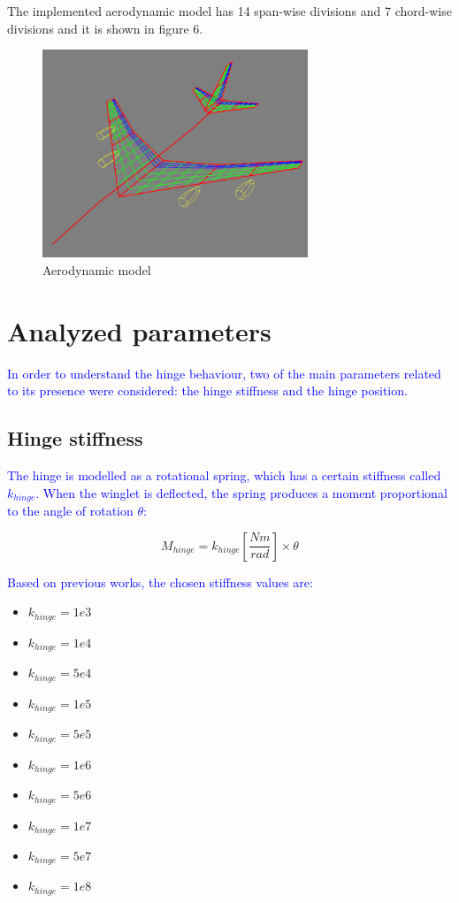 \documentclass[conference]{IEEEtran}
\newlength\figureheight
\newlength\figurewidth
\begin{document}
The implemented aerodynamic model has 14 span-wise divisions and 7 chord-wise divisions and it is shown in figure 6.

\begin{figure}[htp]
  \centering
  \setlength\figureheight{5cm}
  \setlength\figurewidth{7cm}
  \includegraphics[width=225pt]{images/AeroModel.png}
  \caption{Aerodynamic model}
  \label{fig:my-figure}
\end{figure}



\section{Analyzed parameters}

\textcolor{blue}{In order to understand the hinge behaviour, two of the main parameters related to its presence were considered: the hinge stiffness and the hinge position.}

\subsection{Hinge stiffness}
\textcolor{blue}{The hinge is modelled as a rotational spring, which has a certain stiffness called $k_{hinge}$. When the winglet is deflected, the spring produces a moment proportional to the angle of rotation $\theta$:}

\begin{equation}
    M_{hinge} = k_{hinge}[\frac{Nm}{rad}] \times \theta
\end{equation}

\textcolor{blue}{Based on previous works, the chosen stiffness values are: }

\begin{itemize}
    \item $k_{hinge} = 1e3$
    \item $k_{hinge} = 1e4$
    \item $k_{hinge} = 5e4$
    \item $k_{hinge} = 1e5$
    \item $k_{hinge} = 5e5$
    \item $k_{hinge} = 1e6$
    \item $k_{hinge} = 5e6$
    \item $k_{hinge} = 1e7$
    \item $k_{hinge} = 5e7$
    \item $k_{hinge} = 1e8$
\end{itemize}
\end{document}

